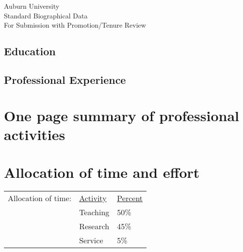 


\newcommand{\longcontent}[1]{}

\newcommand{\oldcontent}[1]{}

\newcommand{\docTitle}{Biographical Data\xspace}


\singlespacing

\newpage


\bigskip
\begin{mytitle}
    Auburn University \\
    Standard Biographical Data \\
    For Submission with Promotion/Tenure Review
\end{mytitle}

\bigskip


\bigskip
\subsection*{Education}


\bigskip
\subsection*{Professional Experience}


\newpage

\section{One page summary of professional activities}



\newpage

\tableofcontents
\newpage

\section{Allocation of time and effort}
\begin{tabular}{ l l l }
    Allocation of time: & \underline{Activity} & \underline{Percent} \\
    & Teaching & 50\% \\
    & Research & 45\% \\
    & Service & 5\% \\
\end{tabular}


